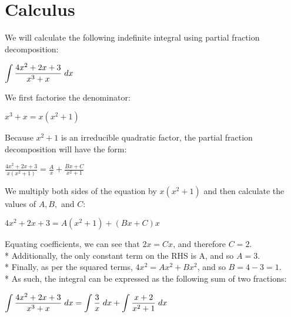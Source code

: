 \documentclass{article}
\begin{document}
\section*{\fontsize{12}{15}\selectfont Calculus}
We will calculate the following indefinite integral using partial fraction decomposition:
\begin{center}
 \( \displaystyle\int \frac{4x^2 + 2x + 3}{x^3 + x} \hspace{0.1cm} dx\)
\end{center}
We first factorise the denominator:
\begin{center}
\( \displaystyle x^3 + x = x(x^2 + 1)\)
\end{center}
Because $x^2 + 1$ is an irreducible quadratic factor, the partial fraction decomposition will have the form:
\begin{center}
  \( \displaystyle \frac{4x^2 + 2x + 3}{x(x^2 + 1)} = \frac{A}{x} + \frac{Bx + C}{x^2 + 1}\) 
\end{center}
\vspace{0.3cm}
We multiply both sides of the equation by \(x(x^2+1)\) and then calculate the values of $A, B,$ and $C:$
\begin{center}

\( \displaystyle 4x^2 + 2x + 3 = A(x^2+1) + (Bx + C)x \)
\end{center}
\vspace{0.1cm}
Equating coefficients, we can see that $2x = Cx$, and therefore $C = 2$. \hspace{0.01cm}
\vspace{0.2cm} \\*
\hspace{0.01cm}
\vspace{0.2cm}
Additionally, the only constant term on the RHS is A, and so $A = 3$.\\*
\hspace{0.01cm} \vspace{0.03cm}
Finally, as per the squared terms, $4x^2 = Ax^2 +  Bx^2$, and so $B = 4 - 3 = 1$. \vspace{0.5cm} \\*
\hspace{0.01cm} \vspace{0.2cm}
As such, the integral can be expressed as the following sum of two fractions:
\begin{center}
  \( \displaystyle\int \frac{4x^2 + 2x + 3}{x^3 + x} \hspace{0.1cm} dx = \int \frac{3}{x} \hspace{0.1cm} dx + \int \frac{x + 2}{x^2+1} \hspace{0.1cm} dx\)
 \end{center}
 
\end{document}

